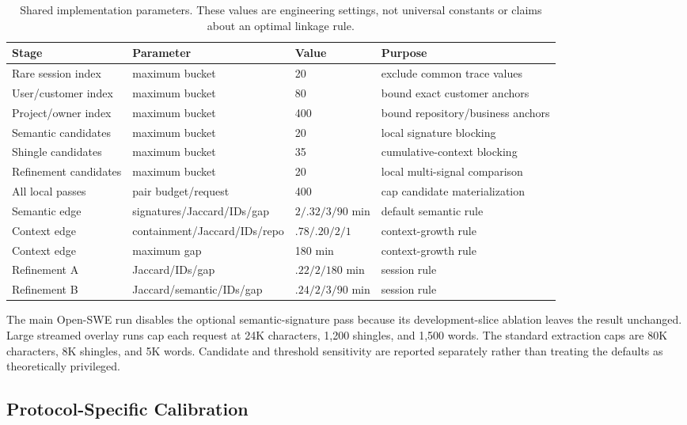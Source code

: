 \documentclass[letterpaper]{article} %
\begin{document}
\begin{table}[t]
\centering
\small
\begin{tabular}{@{}llll@{}}
\toprule
Stage & Parameter & Value & Purpose \\
\midrule
Rare session index & maximum bucket & 20 & exclude common trace values \\
User/customer index & maximum bucket & 80 & bound exact customer anchors \\
Project/owner index & maximum bucket & 400 & bound repository/business anchors \\
Semantic candidates & maximum bucket & 20 & local signature blocking \\
Shingle candidates & maximum bucket & 35 & cumulative-context blocking \\
Refinement candidates & maximum bucket & 20 & local multi-signal comparison \\
All local passes & pair budget/request & 400 & cap candidate materialization \\
Semantic edge & signatures/Jaccard/IDs/gap & $2/.32/3/90$ min & default semantic rule \\
Context edge & containment/Jaccard/IDs/repo & $.78/.20/2/1$ & context-growth rule \\
Context edge & maximum gap & 180 min & context-growth rule \\
Refinement A & Jaccard/IDs/gap & $.22/2/180$ min & session rule \\
Refinement B & Jaccard/semantic/IDs/gap & $.24/2/3/90$ min & session rule \\
\bottomrule
\end{tabular}
\caption{Shared implementation parameters. These values are engineering settings, not universal
constants or claims about an optimal linkage rule.}
\end{table}

The main Open-SWE run disables the optional semantic-signature pass because its development-slice
ablation leaves the result unchanged. Large streamed overlay runs cap each request at 24K characters,
1,200 shingles, and 1,500 words. The standard extraction caps are 80K characters, 8K shingles, and
5K words. Candidate and threshold sensitivity are reported separately rather than treating the
defaults as theoretically privileged.

\subsection{Protocol-Specific Calibration}
\end{document}
